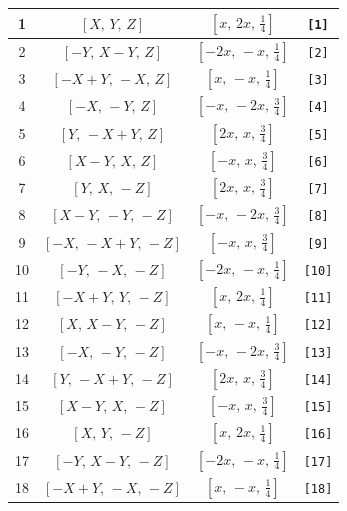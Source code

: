 \documentclass[fleqn,8pt]{jsarticle}
\begin{document}
\begin{longtable}{cccc}
1 & $\left[ X,\, Y,\, Z \right]$ & $\left[ x,\, 2 x,\, \frac{1}{4} \right]$ & {\tt [1]} \\ \hline
2 & $\left[ - Y,\, X - Y,\, Z \right]$ & $\left[ - 2 x,\, - x,\, \frac{1}{4} \right]$ & {\tt [2]} \\ \hline
3 & $\left[ - X + Y,\, - X,\, Z \right]$ & $\left[ x,\, - x,\, \frac{1}{4} \right]$ & {\tt [3]} \\ \hline
4 & $\left[ - X,\, - Y,\, Z \right]$ & $\left[ - x,\, - 2 x,\, \frac{3}{4} \right]$ & {\tt [4]} \\ \hline
5 & $\left[ Y,\, - X + Y,\, Z \right]$ & $\left[ 2 x,\, x,\, \frac{3}{4} \right]$ & {\tt [5]} \\ \hline
6 & $\left[ X - Y,\, X,\, Z \right]$ & $\left[ - x,\, x,\, \frac{3}{4} \right]$ & {\tt [6]} \\ \hline
7 & $\left[ Y,\, X,\, - Z \right]$ & $\left[ 2 x,\, x,\, \frac{3}{4} \right]$ & {\tt [7]} \\ \hline
8 & $\left[ X - Y,\, - Y,\, - Z \right]$ & $\left[ - x,\, - 2 x,\, \frac{3}{4} \right]$ & {\tt [8]} \\ \hline
9 & $\left[ - X,\, - X + Y,\, - Z \right]$ & $\left[ - x,\, x,\, \frac{3}{4} \right]$ & {\tt [9]} \\ \hline
10 & $\left[ - Y,\, - X,\, - Z \right]$ & $\left[ - 2 x,\, - x,\, \frac{1}{4} \right]$ & {\tt [10]} \\ \hline
11 & $\left[ - X + Y,\, Y,\, - Z \right]$ & $\left[ x,\, 2 x,\, \frac{1}{4} \right]$ & {\tt [11]} \\ \hline
12 & $\left[ X,\, X - Y,\, - Z \right]$ & $\left[ x,\, - x,\, \frac{1}{4} \right]$ & {\tt [12]} \\ \hline
13 & $\left[ - X,\, - Y,\, - Z \right]$ & $\left[ - x,\, - 2 x,\, \frac{3}{4} \right]$ & {\tt [13]} \\ \hline
14 & $\left[ Y,\, - X + Y,\, - Z \right]$ & $\left[ 2 x,\, x,\, \frac{3}{4} \right]$ & {\tt [14]} \\ \hline
15 & $\left[ X - Y,\, X,\, - Z \right]$ & $\left[ - x,\, x,\, \frac{3}{4} \right]$ & {\tt [15]} \\ \hline
16 & $\left[ X,\, Y,\, - Z \right]$ & $\left[ x,\, 2 x,\, \frac{1}{4} \right]$ & {\tt [16]} \\ \hline
17 & $\left[ - Y,\, X - Y,\, - Z \right]$ & $\left[ - 2 x,\, - x,\, \frac{1}{4} \right]$ & {\tt [17]} \\ \hline
18 & $\left[ - X + Y,\, - X,\, - Z \right]$ & $\left[ x,\, - x,\, \frac{1}{4} \right]$ & {\tt [18]} \\ \hline

\end{longtable}
\end{document}
